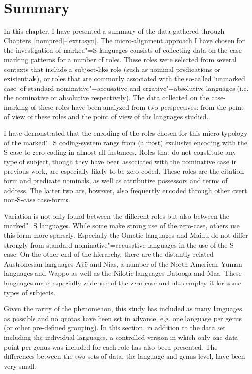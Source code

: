 \section{Summary}\label{sumtyp}

In this chapter, I have presented a summary of the data gathered through Chapters~\ref{nompred}--\ref{extrasyn}. 
The micro-alignment approach I have chosen for the investigation of marked"=S languages consists of collecting data on the case-marking patterns for a number of roles. 
These roles were selected from several contexts that include a subject-like role (such as nominal predications or existentials), or roles that are commonly associated with the so-called `unmarked case' of standard nominative"=accusative and ergative"=absolutive languages (i.e. the nominative or absolutive respectively).
The data collected on the case-marking of these roles have been analyzed from two perspectives: from the point of view of these roles and the point of view of the languages studied.

I have demonstrated that the encoding of the roles chosen for this micro-ty\-po\-lo\-gy of the marked"=S coding-system range from (almost) exclusive encoding with the S-case to zero-coding in almost all instances. 
Roles that do not constitute any type of subject, though they have been associated with the nominative case in previous work, are especially likely to be zero-coded. 
These roles are the citation form and predicate nominals, as well as attributive possessors and terms of address. 
The latter two are, however, also frequently encoded through other overt non-S-case case-forms.

Variation is not only found between the different roles but also between the marked"=S languages. 
While some make strong use of the zero-case, others use this form more sparsely. 
Especially the Omotic languages and Maidu do not differ strongly from standard nominative"=accusative languages in the use of the S-case. 
On the other end of the hierarchy, there are the distantly related Austronesian languages Aji\"e and Nias, a number of the North American Yuman languages and Wappo as well as the Nilotic languages Datooga and Maa. 
These languages make especially wide use of the zero-case and also employ it for some types of subjects. 

Given the rarity of the phenomenon, this study has included as many languages as possible and no quotas have been set in advance, e.g. one language per genus (or other pre-defined grouping). 
In this section, in addition to the data set including the individual languages, a controlled version in which only one data point per genus was included for each role has also been presented. 
The differences between the two sets of data, the language and genus level, have been very small. 

